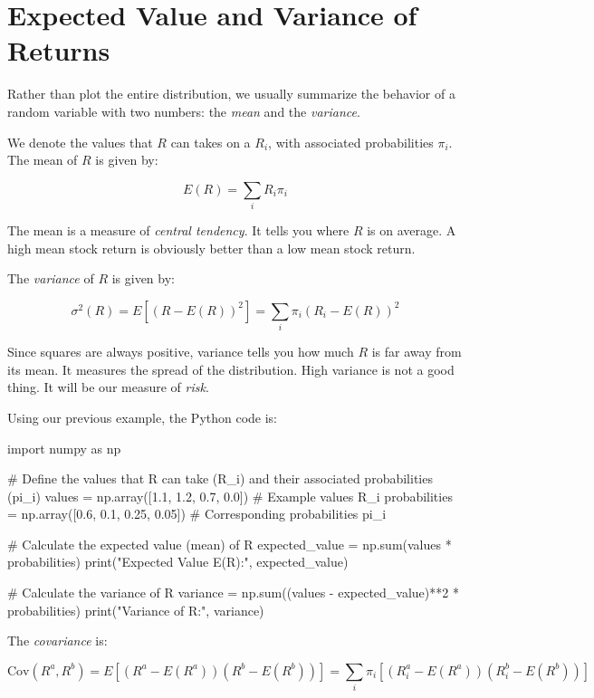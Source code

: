 \section{Expected Value and Variance of Returns}

Rather than plot the entire distribution, 
we usually summarize the behavior of a random variable
with two numbers: the \textit{mean} and the
\textit{variance}.

We denote the values that $R$ can takes on a $R_i$, 
with associated probabilities $\pi_i$. 
The mean of $R$ is given by:

\begin{equation}
    E(R) = \sum_i R_i \pi_i
\end{equation}

The mean is a measure of \textit{central tendency}.
It tells you where $R$ is on average. A high mean
stock return is obviously better than a low mean
stock return.

The \textit{variance} of $R$ is given by:

\begin{equation}
    \sigma^2(R) = E[(R - E(R))^2]
    = \sum_i \pi_i(R_i - E(R))^2
\end{equation}

Since squares are always positive, variance tells 
you how much $R$ is far away from its mean. It 
measures the spread of the distribution. High 
variance is not a good thing. It will be 
our measure of \textit{risk}.

Using our previous example, the Python code is:

\begin{python}
import numpy as np

# Define the values that R can take (R_i) and their associated probabilities (pi_i)
values = np.array([1.1, 1.2, 0.7, 0.0])  # Example values R_i
probabilities = np.array([0.6, 0.1, 0.25, 0.05])  # Corresponding probabilities pi_i

# Calculate the expected value (mean) of R
expected_value = np.sum(values * probabilities)
print("Expected Value E(R):", expected_value)

# Calculate the variance of R
variance = np.sum((values - expected_value)**2 * probabilities)
print("Variance of R:", variance)

\end{python}


The \textit{covariance} is:

\begin{equation}
    \text{Cov}(R^a, R^b) = E[(R^a - E(R^a))(R^b - E(R^b))]
    = \sum_{i} \pi_{i}[(R^a_i - E(R^a))(R^b_i - E(R^b))]
\end{equation}

